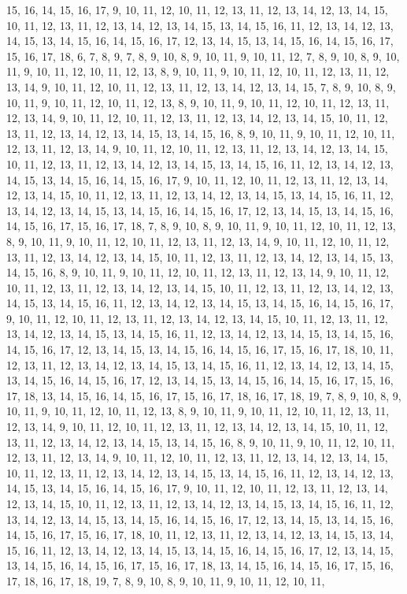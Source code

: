 15, 16, 14, 15, 16, 17, 9, 10, 11, 12, 10, 11, 12, 13, 11, 12, 13, 14, 12, 13, 14, 15, 10, 11, 12, 13, 11, 12, 13, 14, 12, 13, 14, 15, 13, 14, 15, 16, 11, 12, 13, 14, 12, 13, 14, 15, 13, 14, 15, 16, 14, 15, 16, 17, 12, 13, 14, 15, 13, 14, 15, 16, 14, 15, 16, 17, 15, 16, 17, 18, 6, 7, 8, 9, 7, 8, 9, 10, 8, 9, 10, 11, 9, 10, 11, 12, 7, 8, 9, 10, 8, 9, 10, 11, 9, 10, 11, 12, 10, 11, 12, 13, 8, 9, 10, 11, 9, 10, 11, 12, 10, 11, 12, 13, 11, 12, 13, 14, 9, 10, 11, 12, 10, 11, 12, 13, 11, 12, 13, 14, 12, 13, 14, 15, 7, 8, 9, 10, 8, 9, 10, 11, 9, 10, 11, 12, 10, 11, 12, 13, 8, 9, 10, 11, 9, 10, 11, 12, 10, 11, 12, 13, 11, 12, 13, 14, 9, 10, 11, 12, 10, 11, 12, 13, 11, 12, 13, 14, 12, 13, 14, 15, 10, 11, 12, 13, 11, 12, 13, 14, 12, 13, 14, 15, 13, 14, 15, 16, 8, 9, 10, 11, 9, 10, 11, 12, 10, 11, 12, 13, 11, 12, 13, 14, 9, 10, 11, 12, 10, 11, 12, 13, 11, 12, 13, 14, 12, 13, 14, 15, 10, 11, 12, 13, 11, 12, 13, 14, 12, 13, 14, 15, 13, 14, 15, 16, 11, 12, 13, 14, 12, 13, 14, 15, 13, 14, 15, 16, 14, 15, 16, 17, 9, 10, 11, 12, 10, 11, 12, 13, 11, 12, 13, 14, 12, 13, 14, 15, 10, 11, 12, 13, 11, 12, 13, 14, 12, 13, 14, 15, 13, 14, 15, 16, 11, 12, 13, 14, 12, 13, 14, 15, 13, 14, 15, 16, 14, 15, 16, 17, 12, 13, 14, 15, 13, 14, 15, 16, 14, 15, 16, 17, 15, 16, 17, 18, 7, 8, 9, 10, 8, 9, 10, 11, 9, 10, 11, 12, 10, 11, 12, 13, 8, 9, 10, 11, 9, 10, 11, 12, 10, 11, 12, 13, 11, 12, 13, 14, 9, 10, 11, 12, 10, 11, 12, 13, 11, 12, 13, 14, 12, 13, 14, 15, 10, 11, 12, 13, 11, 12, 13, 14, 12, 13, 14, 15, 13, 14, 15, 16, 8, 9, 10, 11, 9, 10, 11, 12, 10, 11, 12, 13, 11, 12, 13, 14, 9, 10, 11, 12, 10, 11, 12, 13, 11, 12, 13, 14, 12, 13, 14, 15, 10, 11, 12, 13, 11, 12, 13, 14, 12, 13, 14, 15, 13, 14, 15, 16, 11, 12, 13, 14, 12, 13, 14, 15, 13, 14, 15, 16, 14, 15, 16, 17, 9, 10, 11, 12, 10, 11, 12, 13, 11, 12, 13, 14, 12, 13, 14, 15, 10, 11, 12, 13, 11, 12, 13, 14, 12, 13, 14, 15, 13, 14, 15, 16, 11, 12, 13, 14, 12, 13, 14, 15, 13, 14, 15, 16, 14, 15, 16, 17, 12, 13, 14, 15, 13, 14, 15, 16, 14, 15, 16, 17, 15, 16, 17, 18, 10, 11, 12, 13, 11, 12, 13, 14, 12, 13, 14, 15, 13, 14, 15, 16, 11, 12, 13, 14, 12, 13, 14, 15, 13, 14, 15, 16, 14, 15, 16, 17, 12, 13, 14, 15, 13, 14, 15, 16, 14, 15, 16, 17, 15, 16, 17, 18, 13, 14, 15, 16, 14, 15, 16, 17, 15, 16, 17, 18, 16, 17, 18, 19, 7, 8, 9, 10, 8, 9, 10, 11, 9, 10, 11, 12, 10, 11, 12, 13, 8, 9, 10, 11, 9, 10, 11, 12, 10, 11, 12, 13, 11, 12, 13, 14, 9, 10, 11, 12, 10, 11, 12, 13, 11, 12, 13, 14, 12, 13, 14, 15, 10, 11, 12, 13, 11, 12, 13, 14, 12, 13, 14, 15, 13, 14, 15, 16, 8, 9, 10, 11, 9, 10, 11, 12, 10, 11, 12, 13, 11, 12, 13, 14, 9, 10, 11, 12, 10, 11, 12, 13, 11, 12, 13, 14, 12, 13, 14, 15, 10, 11, 12, 13, 11, 12, 13, 14, 12, 13, 14, 15, 13, 14, 15, 16, 11, 12, 13, 14, 12, 13, 14, 15, 13, 14, 15, 16, 14, 15, 16, 17, 9, 10, 11, 12, 10, 11, 12, 13, 11, 12, 13, 14, 12, 13, 14, 15, 10, 11, 12, 13, 11, 12, 13, 14, 12, 13, 14, 15, 13, 14, 15, 16, 11, 12, 13, 14, 12, 13, 14, 15, 13, 14, 15, 16, 14, 15, 16, 17, 12, 13, 14, 15, 13, 14, 15, 16, 14, 15, 16, 17, 15, 16, 17, 18, 10, 11, 12, 13, 11, 12, 13, 14, 12, 13, 14, 15, 13, 14, 15, 16, 11, 12, 13, 14, 12, 13, 14, 15, 13, 14, 15, 16, 14, 15, 16, 17, 12, 13, 14, 15, 13, 14, 15, 16, 14, 15, 16, 17, 15, 16, 17, 18, 13, 14, 15, 16, 14, 15, 16, 17, 15, 16, 17, 18, 16, 17, 18, 19, 7, 8, 9, 10, 8, 9, 10, 11, 9, 10, 11, 12, 10, 11, 